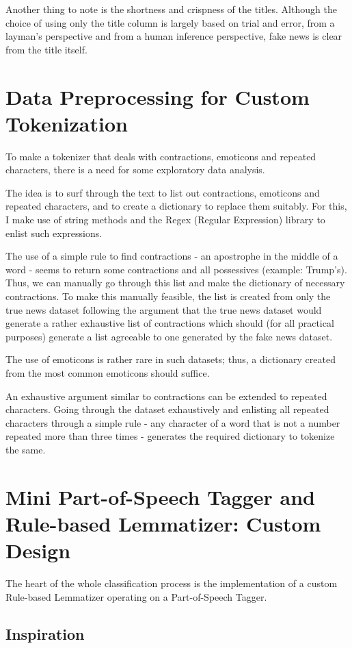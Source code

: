\documentclass{article}
\begin{document}
Another thing to note is the shortness and crispness of the titles. Although the choice of using only the title column is largely based on trial and error, from a layman's perspective and from a human inference perspective, fake news is clear from the title itself. 

\section{Data Preprocessing for Custom Tokenization}
To make a tokenizer that deals with contractions, emoticons and repeated characters, there is a need for some exploratory data analysis.

The idea is to surf through the text to list out contractions, emoticons and repeated characters, and to create a dictionary to replace them suitably. For this, I make use of string methods and the Regex (Regular Expression) library to enlist such expressions.

The use of a simple rule to find contractions - an apostrophe in the middle of a word - seems to return some contractions and all possessives (example: Trump's). Thus, we can manually go through this list and make the dictionary of necessary contractions. To make this manually feasible, the list is created from only the true news dataset following the argument that the true news dataset would generate a rather exhaustive list of contractions which should (for all practical purposes) generate a list agreeable to one generated by the fake news dataset.

The use of emoticons is rather rare in such datasets; thus, a dictionary created from the most common emoticons should suffice. 

An exhaustive argument similar to contractions can be extended to repeated characters. Going through the dataset exhaustively and enlisting all repeated characters through a simple rule - any character of a word that is not a number repeated more than three times - generates the required dictionary to tokenize the same.

\section{Mini Part-of-Speech Tagger and Rule-based Lemmatizer: Custom Design}

The heart of the whole classification process is the implementation of a custom Rule-based Lemmatizer operating on a Part-of-Speech Tagger.

\subsection{Inspiration}
\end{document}
